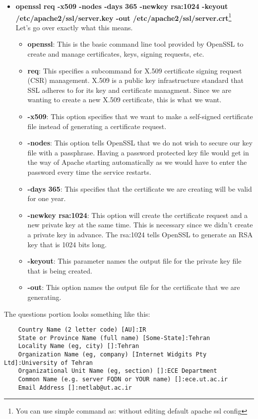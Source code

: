\documentclass{../UTNetLab}
\begin{document}
	\begin{itemize}
		\item \textbf{openssl req -x509 -nodes -days 365 -newkey rsa:1024 -keyout /etc/apache2/ssl/server.key -out /etc/apache2/ssl/server.crt}\footnote{You can use simple command as:  without editing default apache ssl config}\\
		Let's go over exactly what this means.\\
		\begin{itemize}
			\item \textbf{openssl}: This is the basic command line tool provided by OpenSSL to create and manage certificates, keys, signing requests, etc.
			\item \textbf{req}: This specifies a subcommand for X.509 certificate signing request (CSR) management. X.509 is a public key infrastructure standard that SSL adheres to for its key and certificate managment. Since we are wanting to create a new X.509 certificate, this is what we want.
			\item \textbf{-x509}: This option specifies that we want to make a self-signed certificate file instead of generating a certificate request.
			\item \textbf{-nodes}: This option tells OpenSSL that we do not wish to secure our key file with a passphrase. Having a password protected key file would get in the way of Apache starting automatically as we would have to enter the password every time the service restarts.
			\item \textbf{-days 365}: This specifies that the certificate we are creating will be valid for one year.
			\item \textbf{-newkey rsa:1024}: This option will create the certificate request and a new private key at the same time. This is necessary since we didn't create a private key in advance. The rsa:1024 tells OpenSSL to generate an RSA key that is 1024 bits long.
			\item \textbf{-keyout}: This parameter names the output file for the private key file that is being created.
			\item \textbf{-out}: This option names the output file for the certificate that we are generating.	
		\end{itemize}
	\end{itemize}

	The questions portion looks something like this:
	\begin{verbatim}
	Country Name (2 letter code) [AU]:IR 
	State or Province Name (full name) [Some-State]:Tehran 
	Locality Name (eg, city) []:Tehran 
	Organization Name (eg, company) [Internet Widgits Pty Ltd]:University of Tehran 
	Organizational Unit Name (eg, section) []:ECE Department 
	Common Name (e.g. server FQDN or YOUR name) []:ece.ut.ac.ir 
	Email Address []:netlab@ut.ac.ir 
	\end{verbatim}
\end{document}
